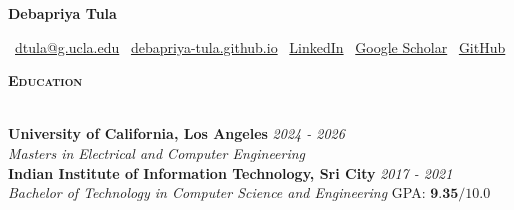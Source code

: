 \documentclass[10pt]{article}
\renewcommand{\section}[1]{
\bigskip
  \begin{Large}
  {\textsc{\textbf{#1}}}
  \end{Large}
  \hrulefill
  \medskip
  \\
}
\providecommand*\email[1]{\href{mailto:#1}{#1}}
\newcommand{\homepage}{https://debapriya-tula.github.io/}
\begin{document}
\begin{LARGE}
\begin{center}\textbf{Debapriya Tula}\end{center}
\end{LARGE}
\smallskip 
\faEnvelope~\email{dtula@g.ucla.edu} \hfill
\faHome~\href{\homepage}{debapriya-tula.github.io} \hfill
\faLinkedin~\href{http://linkedin.com/in/debapriya-tula}{LinkedIn} \hfill
\faGraduationCap~\href{https://scholar.google.com/citations?view_op=list_works&hl=en&authuser=3&user=4lJhtPYAAAAJ}{Google Scholar} \hfill
\faGithub~\href{http://github.com/Debapriya-Tula}{GitHub} \hfill


\section{Education}
\textbf{University of California, Los Angeles} \hfill {\textit{2024 - 2026}}\\
\vspace{1mm}\emph{Masters in Electrical and Computer Engineering}\\
\textbf{Indian Institute of Information Technology, Sri City} \hfill {\textit{2017 - 2021}}\\
\emph{Bachelor of Technology in Computer Science and Engineering} \hfill{GPA: $\textbf{9.35}/10.0$}


\vspace{-1.0mm}
\end{document}
